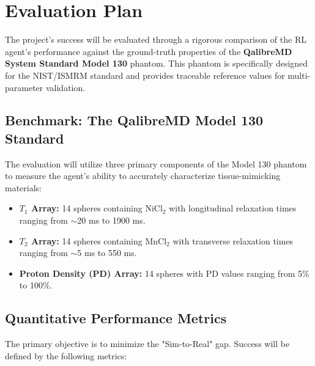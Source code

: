 \section{Evaluation Plan}

The project’s success will be evaluated through a rigorous comparison of the RL agent's performance against the ground-truth properties of the \textbf{QalibreMD System Standard Model 130} phantom. This phantom is specifically designed for the NIST/ISMRM standard and provides traceable reference values for multi-parameter validation.

\subsection{Benchmark: The QalibreMD Model 130 Standard}
The evaluation will utilize three primary components of the Model 130 phantom to measure the agent's ability to accurately characterize tissue-mimicking materials:
\begin{itemize}
    \item \textbf{$T_1$ Array:} 14 spheres containing NiCl$_2$ with longitudinal relaxation times ranging from $\sim$20 ms to 1900 ms.
    \item \textbf{$T_2$ Array:} 14 spheres containing MnCl$_2$ with transverse relaxation times ranging from $\sim$5 ms to 550 ms.
    \item \textbf{Proton Density (PD) Array:} 14 spheres with PD values ranging from 5\% to 100\%.
\end{itemize}

\subsection{Quantitative Performance Metrics}
The primary objective is to minimize the "Sim-to-Real" gap. Success will be defined by the following metrics:

